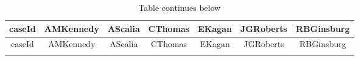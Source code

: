 \documentclass[12pt,twoside]{article}
\begin{document}
\begin{longtable}[c]{@{}ccccccc@{}}
\caption{Table continues below}\tabularnewline
\toprule
\begin{minipage}[b]{0.10\columnwidth}\centering\strut
caseId
\strut\end{minipage} &
\begin{minipage}[b]{0.13\columnwidth}\centering\strut
AMKennedy
\strut\end{minipage} &
\begin{minipage}[b]{0.11\columnwidth}\centering\strut
AScalia
\strut\end{minipage} &
\begin{minipage}[b]{0.11\columnwidth}\centering\strut
CThomas
\strut\end{minipage} &
\begin{minipage}[b]{0.10\columnwidth}\centering\strut
EKagan
\strut\end{minipage} &
\begin{minipage}[b]{0.13\columnwidth}\centering\strut
JGRoberts
\strut\end{minipage} &
\begin{minipage}[b]{0.13\columnwidth}\centering\strut
RBGinsburg
\strut\end{minipage}\tabularnewline
\midrule
\endfirsthead
\toprule
\begin{minipage}[b]{0.10\columnwidth}\centering\strut
caseId
\strut\end{minipage} &
\begin{minipage}[b]{0.13\columnwidth}\centering\strut
AMKennedy
\strut\end{minipage} &
\begin{minipage}[b]{0.11\columnwidth}\centering\strut
AScalia
\strut\end{minipage} &
\begin{minipage}[b]{0.11\columnwidth}\centering\strut
CThomas
\strut\end{minipage} &
\begin{minipage}[b]{0.10\columnwidth}\centering\strut
EKagan
\strut\end{minipage} &
\begin{minipage}[b]{0.13\columnwidth}\centering\strut
JGRoberts
\strut\end{minipage} &
\begin{minipage}[b]{0.13\columnwidth}\centering\strut
RBGinsburg
\strut\end{minipage}\tabularnewline
\midrule
\endhead
\begin{minipage}[t]{0.10\columnwidth}\centering\strut

\end{minipage}
\end{longtable}
\end{document}
